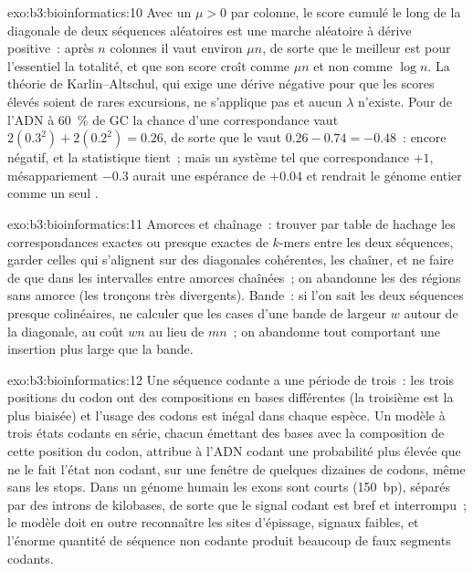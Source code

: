 \begin{solution}{exo:b3:bioinformatics:10}
Avec un  $\mu > 0$ par colonne, le score cumulé le long de
la diagonale de deux séquences aléatoires est une marche aléatoire à
dérive positive~: après $n$ colonnes il vaut environ $\mu n$, de sorte
que le meilleur  est pour l'essentiel la totalité, et
que son score croît comme $\mu n$ et non comme $\log n$. La théorie de
Karlin--Altschul, qui exige une dérive négative pour que les scores
élevés soient de rares excursions, ne s'applique pas et aucun $\lambda$
n'existe. Pour de l'ADN à \qty{60}{\%} de GC la chance d'une
correspondance vaut $2(0.3^{2}) + 2(0.2^{2}) = 0.26$, de sorte que le
 vaut $0.26 - 0.74 = -0.48$~: encore négatif, et la
statistique tient~; mais un système tel que correspondance $+1$,
mésappariement $-0.3$ aurait une espérance de $+0.04$ et rendrait le
génome entier comme un seul .
\end{solution}

\begin{solution}{exo:b3:bioinformatics:11}
Amorces et chaînage~: trouver par table de hachage les correspondances
exactes ou presque exactes de $k$-mers entre les deux séquences, garder
celles qui s'alignent sur des diagonales cohérentes, les chaîner, et ne
faire de  que dans les intervalles entre amorces
chaînées~; on abandonne les  des régions sans amorce (les
tronçons très divergents). Bande~: si l'on sait les deux séquences
presque colinéaires, ne calculer que les cases d'une bande de largeur
$w$ autour de la diagonale, au coût $wn$ au lieu de $mn$~; on abandonne
tout  comportant une insertion plus large que la bande.
\end{solution}

\begin{solution}{exo:b3:bioinformatics:12}
Une séquence codante a une période de trois~: les trois positions du
codon ont des compositions en bases différentes (la troisième est la
plus biaisée) et l'usage des codons est inégal dans chaque espèce. Un
modèle à trois états codants en série, chacun émettant des bases avec la
composition de cette position du codon, attribue à l'ADN codant une
probabilité plus élevée que ne le fait l'état non codant, sur une
fenêtre de quelques dizaines de codons, même sans les stops. Dans un
génome humain les exons sont courts (\qty{150}{bp}), séparés par des
introns de kilobases, de sorte que le signal codant est bref et
interrompu~; le modèle doit en outre reconnaître les sites d'épissage,
signaux faibles, et l'énorme quantité de séquence non codante produit
beaucoup de faux segments codants.
\end{solution}

